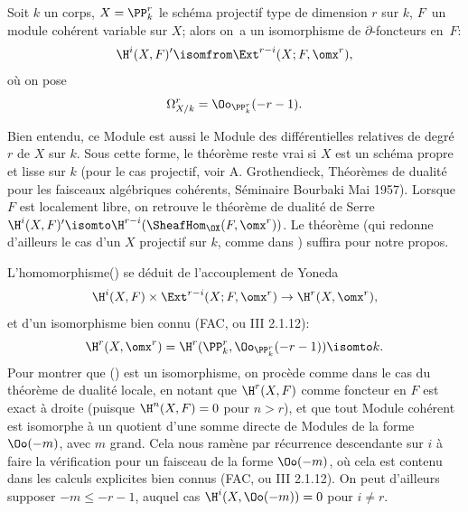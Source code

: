 \begin{theoreme} \label{XII.1.1}
Soit $k$ un corps, $X=\PP_k^r$ le sch\'ema projectif type de dimension $r$ sur $k$, $F$~un module coh\'erent variable sur $X$; alors on~a un isomorphisme de $\partial$-foncteurs en~$F$:
\steco
\begin{equation} \label{eq:XII.1} {}\H^i(X, F)' \isomfrom \Ext^{r-i}(X;F, \omx^r),
\end{equation}
o\`u on pose
\steco
\begin{equation} \label{eq:XII.2} {}\Omega_{X/k}^r= \Oo_{\PP_k^r}(-r-1).
\end{equation}
\end{theoreme}

\begin{remarquestar}
Bien entendu, ce Module est aussi le Module des diff\'erentielles relatives de degr\'e $r$ de $X$ sur $k$. Sous cette forme, le th\'eor\`eme reste vrai si $X$ est un sch\'ema propre et lisse sur $k$ (pour le cas projectif, voir A. Grothendieck, \og Th\'eor\`emes de dualit\'e pour les faisceaux alg\'ebriques coh\'erents\fg, S\'eminaire Bourbaki Mai 1957). Lorsque $F$ est localement libre, on retrouve le th\'eor\`eme de dualit\'e de Serre $\H^i(X, F)' \isomto \H^{r-i}(\SheafHom_{\OX}(F, \omx^r))$. Le th\'eor\`eme  (qui redonne d'ailleurs le cas d'un $X$ projectif sur $k$, comme dans {\loccit}) suffira pour notre propos.
\end{remarquestar} L'homomorphisme\pageoriginale () se d\'eduit de l'accouplement de Yoneda
\steco
\begin{equation} \label{eq:XII.3} {}\H^i(X, F) \times \Ext^{r-i}(X;F, \omx^r) \to \H^r(X, \omx^r),
\end{equation}
et d'un isomorphisme bien connu (\cf FAC, ou \EGA III 2.1.12):
\steco
\begin{equation} \label{eq:XII.4} {}\H^r(X, \omx^r) = \H^r(\PP_k^r, \Oo_{\PP_k^r}(-r-1)) \isomto k.
\end{equation}
Pour montrer que () est un isomorphisme, on proc\`ede comme dans le cas du th\'eor\`eme de dualit\'e locale, en notant que $\H^r(X, F)$ comme foncteur en $F$ est exact \`a droite (puisque $\H^n(X, F)=0$ pour $n>r$), et que tout Module coh\'erent est isomorphe \`a un quotient d'une somme directe de Modules de la forme $\Oo(-m)$, avec $m$ grand. Cela nous ram\`ene par r\'ecurrence descendante sur $i$ \`a faire la v\'erification pour un faisceau de la forme $\Oo(-m)$, o\`u cela est contenu dans les calculs explicites bien connus (FAC, ou \EGA III 2.1.12). On peut d'ailleurs supposer $-m \leq -r-1$, auquel cas $\H^i(X, \Oo(-m))=0$ pour $i\neq r$.

